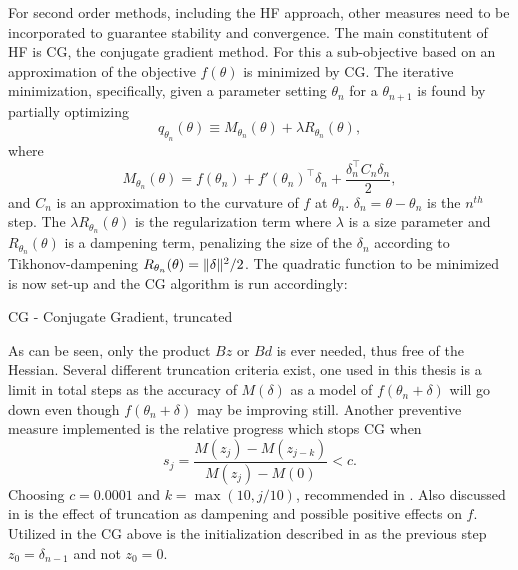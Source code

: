 For second order methods, including the HF approach, other measures need to be incorporated to guarantee stability and convergence. The main constitutent of HF is CG, the conjugate gradient method. For this a sub-objective based on an approximation of the objective $f(\theta)$ is minimized by CG. The iterative minimization, specifically, given a parameter setting $\theta_n$ for a $\theta_{n+1}$ is found by partially optimizing \[q_{\theta_n} (\theta) \equiv M_{\theta_n}(\theta) + \lambda R_{\theta_n}(\theta),\] where \[M_{\theta_n}(\theta) = f(\theta_n) + f'(\theta_n)^\top \delta_n + \frac{\delta_n^\top C_n \delta_n}{2},\] and $C_n$ is an approximation to the curvature of $f$ at $\theta_n$. $\delta_n = \theta - \theta_n$ is the $n^{th}$ step. The $\lambda R_{\theta_n}(\theta)$ is the regularization term where $\lambda$ is a size parameter and $R_{\theta_n}(\theta)$ is a dampening term, penalizing the size of the $\delta_n$ according to Tikhonov-dampening $R_{\theta_n}(\theta) = \lVert\delta\rVert^2/2$. The quadratic function to be minimized is now set-up and the CG algorithm is run accordingly:

\begin{algorithm}
    \caption{CG - Conjugate Gradient, truncated}
    \begin{algorithmic}[1]
        \EndWhile
    \end{algorithmic}
\end{algorithm}

As can be seen, only the product $Bz$ or $Bd$ is ever needed, thus free of the Hessian. Several different truncation criteria exist, one used in this thesis is a limit in total steps as the accuracy of $M(\delta)$ as a model of $f(\theta_n + \delta)$ will go down even though $f(\theta_n + \delta)$ may be improving still. Another preventive measure implemented is the relative progress which stops CG when \[s_j = \frac{M(z_j) - M(z_{j-k})}{M(z_j) - M(0)} < c.\]  Choosing $c = 0.0001$ and $k= \max (10, j/10)$, recommended in \cite{suts}. Also discussed in \textcite{Martens2012} is the effect of truncation as dampening and possible positive effects on $f$. Utilized in the CG above is the initialization described in \cite{Martens2012} as the previous step $z_0 = \delta_{n-1}$ and not $z_0 = 0$.

